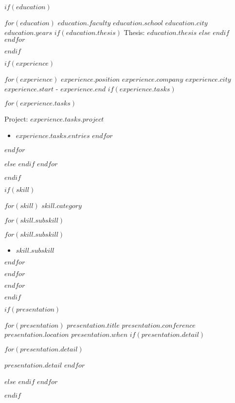 \documentclass[$fontSize$, $format$]{awesome-cv}
\begin{document}
\makecvheader
{}

$if(education)$
\begin{cventries}
    $for(education)$
    \cventry
    {$education.faculty$}
    {$education.school$}
    {$education.city$}
    {$education.years$}
    $if(education.thesis)$
    {Thesis: \textit{$education.thesis$}}
    $else$
    {}
    $endif$
    $endfor$
\end{cventries}
$endif$

$if(experience)$
\begin{cventries}
    $for(experience)$
    \cventry
    {$experience.position$}
    {$experience.company$}
    {$experience.city$}
    {$experience.start$ - $experience.end$}
    $if(experience.tasks)$
    {
        \begin{cvitems}
            $for(experience.tasks)$
            \item[]{
                \begin{scriptsize}Project: \textit{$experience.tasks.project$}\end{scriptsize}
                \begin{itemize}
                    $for(experience.tasks.entries)$
                    \item $experience.tasks.entries$
                    $endfor$
                \end{itemize}
            }
            $endfor$
        \end{cvitems}
    }
    $else$
    {}
    $endif$
    $endfor$
\end{cventries}
$endif$

$if(skill)$
\begin{cvskills}
$for(skill)$
    \cvskill
    {$skill.category$}
    {
        $for(skill.subskill)$
        \begin{minipage}[t]{.35\linewidth}
        $for(skill.subskill)$
        \begin{itemize}
            \item{$skill.subskill$}
        \end{itemize}
        $endfor$
        \end{minipage}
        $endfor$
        \vspace{5pt}
    }
$endfor$
\end{cvskills}
$endif$

$if(presentation)$
\begin{cventries}
    $for(presentation)$
    \cventry
        {$presentation.title$}
        {$presentation.conference$}
        {$presentation.location$}
        {$presentation.when$}
        $if(presentation.detail)$
        {
            \begin{cvitems}
            $for(presentation.detail)$
                \item{$presentation.detail$}
            $endfor$
            \end{cvitems}
        }
        $else$
        {}
        $endif$
    $endfor$
\end{cventries}
$endif$
\end{document}
